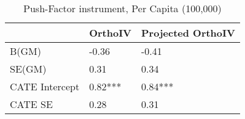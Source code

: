 \begin{table}\centering\caption{Push-Factor instrument, Per Capita (100,000)}\begin{tabular}{lll}
\toprule
                & OrthoIV   & Projected OrthoIV   \\
\midrule
 B(GM)          & -0.36     & -0.41               \\
 SE(GM)         & 0.31      & 0.34                \\
 CATE Intercept & 0.82***   & 0.84***             \\
 CATE SE        & 0.28      & 0.31                \\
\bottomrule
\end{tabular}\end{table}